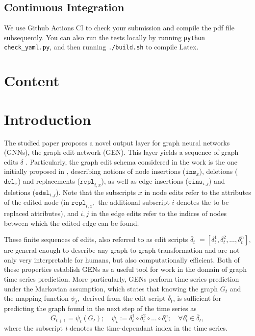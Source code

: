 \subsection{Continuous Integration}

We use Github Actions CI to check your submission and compile the pdf file subsequently.
You can also run the tests locally by running \texttt{python check\_yaml.py}, and then running \texttt{./build.sh} to compile Latex.

\clearpage

\section{Content}
\section{Introduction}



The studied paper proposes a novel output layer for graph neural networks (GNNs), the graph edit network (GEN). This layer yields a sequence of graph edits $\delta$ .
Particularly, the graph edit schema considered in the work is the one initially proposed in \cite{sanfeliu1983distance}, describing notions of node insertions ($\texttt{ins}_{x}$), deletions ($\texttt{del}_{x}$) and replacements ($\texttt{repl}_{i,x}$), as well as edge insertions ($\texttt{eins}_{i,j}$) and deletions ($\texttt{edel}_{i,j}$). Note that the subscripts $x$ in node edits refer to the attributes of the edited node (in $\texttt{repl}_{i,x},$ the additional subscript $i$ denotes the to-be replaced attributes), and $i,j$ in the edge edits refer to the indices of nodes between which the edited edge can be found. 

These finite sequences of edits, also referred to as edit scripts $\bar{\delta}_{t}$ $= [\delta^{1}_{t}, \delta^{2}_{t}, \dots, \delta^{n}_{t}]$, are general enough to describe any graph-to-graph transformation and are not only very interpretable for humans, but also computationally efficient. Both of these properties establish GENs as a useful tool for work in the domain of graph time series prediction. More particularly, GENs perform time series prediction under the Markovian assumption, which states that knowing the graph $G_{t}$ and the mapping function $\psi_{t},$ derived from the edit script $\bar{\delta}_{t}$, is sufficient for predicting the graph found in the next step of the time series as 
\begin{equation*}
    G_{t+1} = \psi_{t}(G_{t}); \quad \psi_{t} := \delta^{1}_{t} \circ \delta^{2}_{t} \circ \dots \circ \delta^{n}_{t}; \quad \forall \delta^{i}_{t} \in \bar{\delta}_{t},
\end{equation*} where the subscript \textit{t} denotes the time-dependant index in the time series.
